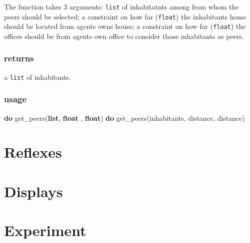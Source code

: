 \documentclass[]{book}
\newenvironment{Shaded}{\begin{snugshade}}{\end{snugshade}}
\newcommand{\KeywordTok}[1]{\textcolor[rgb]{0.13,0.29,0.53}{\textbf{#1}}}
\newcommand{\NormalTok}[1]{#1}
\newcommand{\OtherTok}[1]{\textcolor[rgb]{0.56,0.35,0.01}{#1}}
\theoremstyle{definition}
\theoremstyle{definition}
\theoremstyle{definition}
\theoremstyle{remark}
\begin{document}
The function takes 3 arguments: \texttt{list} of inhabitatnts among from
whom the peers should be selected; a constraint on how far
(\texttt{float}) the inhabitants home should be located from agents owns
house; a constraint on how far (\texttt{float}) the offices should be
from agents own office to consider those inhabitants as peers.

\hypertarget{returns-6}{%
\subsection*{returns}\label{returns-6}}

a \texttt{list} of inhabitants.

\hypertarget{usage-6}{%
\subsection*{usage}\label{usage-6}}

\begin{Shaded}
\begin{Highlighting}[]
\KeywordTok{do}\NormalTok{ get_peers}\OtherTok{(}\KeywordTok{list}\OtherTok{,} \KeywordTok{float} \OtherTok{,} \KeywordTok{float}\OtherTok{)}
\KeywordTok{do}\NormalTok{ get_peers}\OtherTok{(}\NormalTok{inhabitants}\OtherTok{,}\NormalTok{ distance}\OtherTok{,}\NormalTok{ distance}\OtherTok{)}
\end{Highlighting}
\end{Shaded}

\hypertarget{reflexes}{%
\chapter{Reflexes}\label{reflexes}}

\hypertarget{displays}{%
\chapter{Displays}\label{displays}}

\hypertarget{experiment}{%
\chapter{Experiment}\label{experiment}}

\printindex
\end{document}
